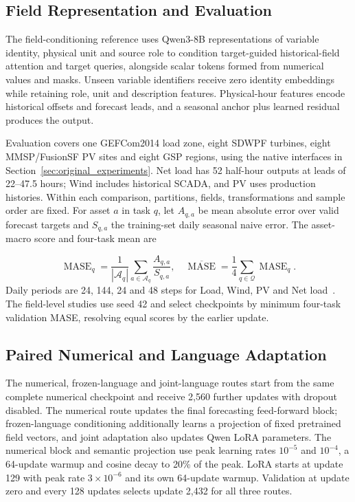 \documentclass[journal]{IEEEtran}
\begin{document}
\subsection{Field Representation and Evaluation}

The field-conditioning reference uses Qwen3-8B representations of variable identity, physical unit and source role to condition target-guided historical-field attention and target queries, alongside scalar tokens formed from numerical values and masks. Unseen variable identifiers receive zero identity embeddings while retaining role, unit and description features. Physical-hour features encode historical offsets and forecast leads, and a seasonal anchor plus learned residual produces the output.

Evaluation covers one GEFCom2014 load zone, eight SDWPF turbines, eight MMSP/FusionSF PV sites and eight GSP regions, using the native interfaces in Section~\ref{sec:original_experiments}. Net load has 52 half-hour outputs at leads of 22--47.5 hours; Wind includes historical SCADA, and PV uses production histories. Within each comparison, partitions, fields, transformations and sample order are fixed. For asset $a$ in task $q$, let $A_{q,a}$ be mean absolute error over valid forecast targets and $S_{q,a}$ the training-set daily seasonal naive error. The asset-macro score and four-task mean are


\begin{equation}
\label{eq:language_study_mase}
\operatorname{MASE}_q=\frac{1}{|\mathcal A_q|}\sum_{a\in\mathcal A_q}\frac{A_{q,a}}{S_{q,a}},
\quad
\overline{\operatorname{MASE}}=\frac14\sum_{q\in\mathcal Q}\operatorname{MASE}_q.
\end{equation}
Daily periods are 24, 144, 24 and 48 steps for Load, Wind, PV and Net load~\cite{hyndman2006accuracy}. The field-level studies use seed 42 and select checkpoints by minimum four-task validation MASE, resolving equal scores by the earlier update.

\subsection{Paired Numerical and Language Adaptation}

The numerical, frozen-language and joint-language routes start from the same complete numerical checkpoint and receive 2,560 further updates with dropout disabled. The numerical route updates the final forecasting feed-forward block; frozen-language conditioning additionally learns a projection of fixed pretrained field vectors, and joint adaptation also updates Qwen LoRA parameters. The numerical block and semantic projection use peak learning rates $10^{-5}$ and $10^{-4}$, a 64-update warmup and cosine decay to 20\% of the peak. LoRA starts at update 129 with peak rate $3\times10^{-6}$ and its own 64-update warmup. Validation at update zero and every 128 updates selects update 2,432 for all three routes.
\end{document}
